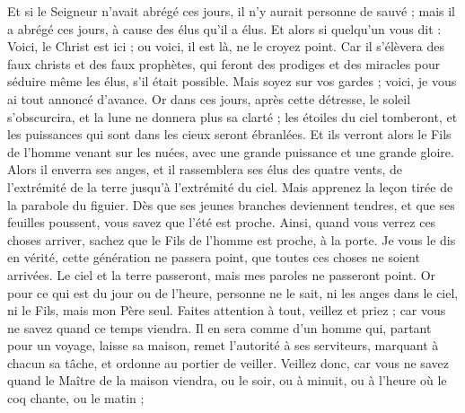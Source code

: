 \begin{multicols}{2}
Et si le Seigneur n’avait abrégé ces jours, il n'y aurait personne de sauvé ; mais il a abrégé ces jours, à cause des élus qu’il a élus.
Et alors si quelqu'un vous dit : Voici, le Christ est ici ; ou voici, il est là, ne le croyez point.
Car il s'élèvera des faux christs et des faux prophètes, qui feront des prodiges et des miracles pour séduire même les élus, s'il était possible.
Mais soyez sur vos gardes ; voici, je vous ai tout annoncé d’avance.
Or dans ces jours, après cette détresse, le soleil s’obscurcira, et la lune ne donnera plus sa clarté ;
les étoiles du ciel tomberont, et les puissances qui sont dans les cieux seront ébranlées.
Et ils verront alors le Fils de l'homme venant sur les nuées, avec une grande puissance et une grande gloire.
Alors il enverra ses anges, et il rassemblera ses élus des quatre vents, de l’extrémité de la terre jusqu’à l’extrémité du ciel.
Mais apprenez la leçon tirée de la parabole du figuier. Dès que ses jeunes branches deviennent tendres, et que ses feuilles poussent, vous savez que l'été est proche.
Ainsi, quand vous verrez ces choses arriver, sachez que le Fils de l’homme est proche, à la porte.
Je vous le dis en vérité, cette génération ne passera point, que toutes ces choses ne soient arrivées.
Le ciel et la terre passeront, mais mes paroles ne passeront point.
Or pour ce qui est du jour ou de l’heure, personne ne le sait, ni les anges dans le ciel, ni le Fils, mais mon Père seul.
Faites attention à tout, veillez et priez ; car vous ne savez quand ce temps viendra.
Il en sera comme d’un homme qui, partant pour un voyage, laisse sa maison, remet l’autorité à ses serviteurs, marquant à chacun sa tâche, et ordonne au portier de veiller.
Veillez donc, car vous ne savez quand le Maître de la maison viendra, ou le soir, ou à minuit, ou à l'heure où le coq chante, ou le matin ;

\end{multicols}
